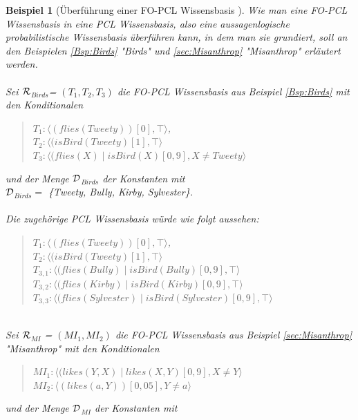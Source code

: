 \documentclass[a4paper, 11pt]{book}
\newtheorem{Bsp}{Beispiel}[section]
\begin{document}
\begin{Bsp}[Überführung einer FO-PCL Wissensbasis ]
	Wie man eine FO-PCL Wissensbasis in eine PCL Wissensbasis, also eine aussagenlogische probabilistische Wissensbasis überführen kann, in dem man sie grundiert, soll an den Beispielen  \ref{Bsp:Birds} "{}Birds"{} und \ref{sec:Misanthrop} "{}Misanthrop"{}  erläutert werden.\\
	\\
	Sei $ \cal{R} $$_{Birds} $= $ (T_1, T_2, T_3)  $ die FO-PCL Wissensbasis aus Beispiel  \ref{Bsp:Birds} mit den Konditionalen 
	\begin{quote}
	$ T_{1}  :  \langle (flies(Tweety))[0], \top \rangle $,\\
	$ T_{2} : \langle (isBird(Tweety) [1], \top \rangle$\\
	$ T_{3} : \langle (flies(X) \mid isBird(X)[0,9], X \neq Tweety \rangle$\\
	\end{quote}
	und der Menge $ \cal{D} $$_{Birds}  $ der Konstanten mit\\
	$ \cal{D} $$_{Birds} = $ \{Tweety, Bully, Kirby, Sylvester\}. \\
	\\
	Die zugehörige PCL Wissensbasis würde wie folgt aussehen:
	\begin{quote}
	$ T_{1}  :  \langle (flies(Tweety))[0], \top \rangle $,\\
	$ T_{2} : \langle (isBird(Tweety) [1], \top \rangle$\\
	$ T_{3,1} : \langle (flies(Bully) \mid isBird(Bully)[0,9], \top \rangle$\\
	$ T_{3,2} : \langle (flies(Kirby) \mid isBird(Kirby)[0,9], \top \rangle$\\
	$ T_{3,3} : \langle (flies(Sylvester) \mid isBird(Sylvester)[0,9], \top \rangle$
	\end{quote}
	\noindent
	\\
	Sei $ \cal{R} $$_{MI} $ = $ (MI_1, MI_2)  $ die FO-PCL Wissensbasis aus Beispiel \ref{sec:Misanthrop} "{}Misanthrop"{} mit den Konditionalen 
	\begin{quote}
	$ MI_1 : \langle (likes(Y, X) \mid likes(X, Y)[0,9], X \neq Y \rangle$\\
	$ MI_2 : \langle (likes(a, Y))[0,05], Y \neq a \rangle$\\
	\end{quote}
	und der Menge $ \cal{D} $$_{MI}  $ der Konstanten mit
	

\end{Bsp}
\end{document}

